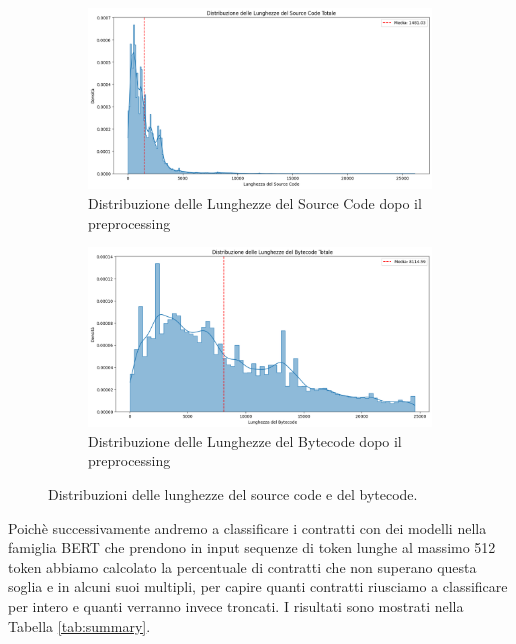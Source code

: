 \documentclass[../../Thesis.tex]{subfiles}
\begin{document}
\begin{figure}[htbp]
    \centering
    \begin{subfigure}[b]{0.49\textwidth}
        \centering
        \includegraphics[width=\textwidth]{../../img/SCTokensPreprocessed.png}
        \caption{Distribuzione delle Lunghezze del Source Code dopo il preprocessing}
        \label{fig:sourcecode_length_distribution}
    \end{subfigure}
    \hfill
    \begin{subfigure}[b]{0.49\textwidth}
        \centering
        \includegraphics[width=\textwidth]{../../img/BCTokensPreprocessed.png}
        \caption{Distribuzione delle Lunghezze del Bytecode dopo il preprocessing}
        \label{fig:bytecode_length_distribution}
    \end{subfigure}
    \caption{Distribuzioni delle lunghezze del source code e del bytecode.}
    \label{fig:length_distributions}
\end{figure}
Poichè successivamente andremo a classificare i contratti con dei modelli nella famiglia BERT che prendono in input sequenze di token lunghe al massimo 512 token abbiamo calcolato la percentuale di contratti che non superano questa soglia e in alcuni suoi multipli, per capire quanti contratti riusciamo a classificare per intero e quanti verranno invece troncati. I risultati sono mostrati nella Tabella \ref{tab:summary}.
\end{document}
